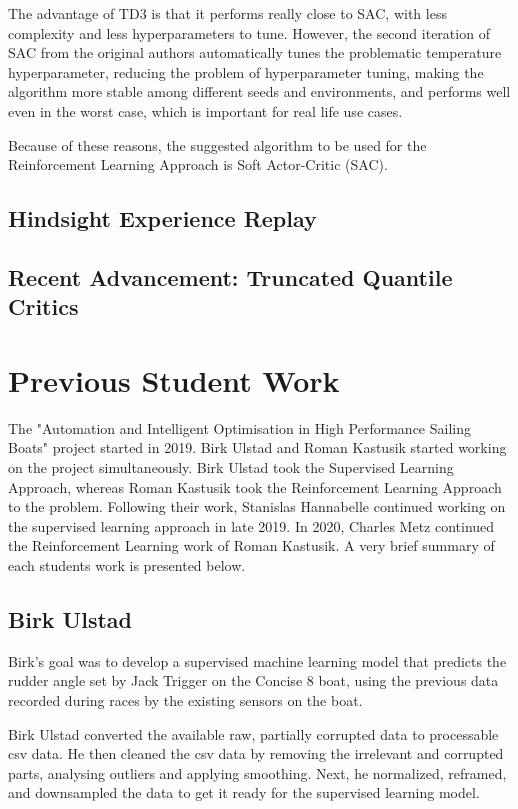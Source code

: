 \documentclass[12pt,twoside]{report}
\begin{document}
The advantage of TD3 is that it performs really close to SAC, with less complexity and less hyperparameters to tune. However, the second iteration of SAC from the original authors automatically tunes the problematic temperature hyperparameter, reducing the problem of hyperparameter tuning, making the algorithm more stable among different seeds and environments, and performs well even in the worst case, which is important for real life use cases. \cite{sacOG}

Because of these reasons, the suggested algorithm to be used for the Reinforcement Learning Approach is Soft Actor-Critic (SAC).

\subsection{Hindsight Experience Replay}

\subsection{Recent Advancement: Truncated Quantile Critics}

\section{Previous Student Work}
The "Automation and Intelligent Optimisation in High Performance Sailing Boats" project started in 2019. Birk Ulstad and Roman Kastusik started working on the project simultaneously. Birk Ulstad took the Supervised Learning Approach, whereas Roman Kastusik took the Reinforcement Learning Approach to the problem. Following their work, Stanislas Hannabelle continued working on the supervised learning approach in late 2019. In 2020, Charles Metz continued the Reinforcement Learning work of Roman Kastusik. A very brief summary of each students work is presented below.

\subsection{Birk Ulstad}
Birk's goal was to develop a supervised machine learning model that predicts the rudder angle set by Jack Trigger on the Concise 8 boat, using the previous data recorded during races by the existing sensors on the boat. \cite{birk}

Birk Ulstad converted the available raw, partially corrupted data to processable csv data. He then cleaned the csv data by removing the irrelevant and corrupted parts, analysing outliers and applying smoothing. Next, he normalized, reframed, and downsampled the data to get it ready for the supervised learning model.
\end{document}
